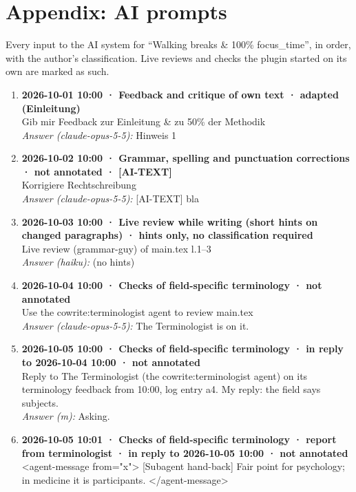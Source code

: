 \section*{Appendix: AI prompts}

Every input to the AI system for “Walking breaks \& 100\% focus\_time”, in order, with the author's classification. Live reviews and checks the plugin started on its own are marked as such.

\begin{enumerate}
  \item \textbf{2026-10-01 10:00 · Feedback and critique of own text · adapted (Einleitung)} \\
  Gib mir Feedback zur Einleitung \& zu 50\% der Methodik
  \\ \textit{Answer (claude-opus-5-5):} Hinweis 1
  \item \textbf{2026-10-02 10:00 · Grammar, spelling and punctuation corrections · not annotated · [AI-TEXT]} \\
  Korrigiere Rechtschreibung
  \\ \textit{Answer (claude-opus-5-5):} [AI-TEXT] bla
  \item \textbf{2026-10-03 10:00 · Live review while writing (short hints on changed paragraphs) · hints only, no classification required} \\
  Live review (grammar-guy) of main.tex l.1–3
  \\ \textit{Answer (haiku):} (no hints)
  \item \textbf{2026-10-04 10:00 · Checks of field-specific terminology · not annotated} \\
  Use the cowrite:terminologist agent to review main.tex
  \\ \textit{Answer (claude-opus-5-5):} The Terminologist is on it.
  \item \textbf{2026-10-05 10:00 · Checks of field-specific terminology · in reply to 2026-10-04 10:00 · not annotated} \\
  Reply to The Terminologist (the cowrite:terminologist agent) on its terminology feedback from 10:00, log entry a4. My reply: the field says subjects.
  \\ \textit{Answer (m):} Asking.
  \item \textbf{2026-10-05 10:01 · Checks of field-specific terminology · report from terminologist · in reply to 2026-10-05 10:00 · not annotated} \\
  <agent-message from="x"> [Subagent hand-back] Fair point for psychology; in medicine it is participants. </agent-message>

\end{enumerate}
